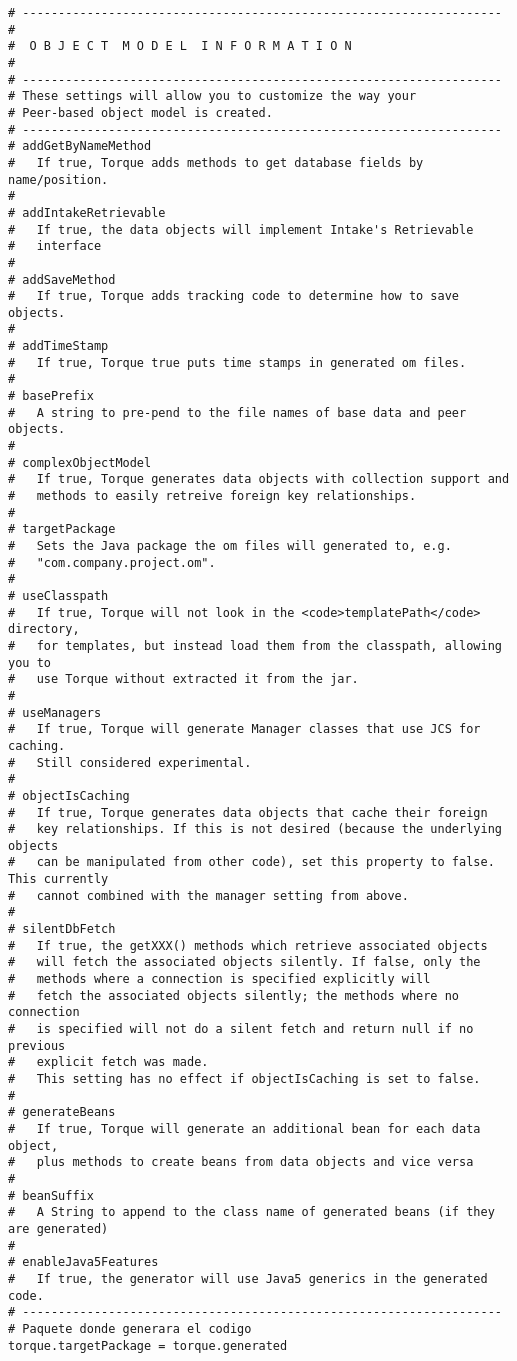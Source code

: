\begin{lstlisting}
# -------------------------------------------------------------------
#
#  O B J E C T  M O D E L  I N F O R M A T I O N
#
# -------------------------------------------------------------------
# These settings will allow you to customize the way your
# Peer-based object model is created.
# -------------------------------------------------------------------
# addGetByNameMethod
#   If true, Torque adds methods to get database fields by name/position.
#
# addIntakeRetrievable
#   If true, the data objects will implement Intake's Retrievable
#   interface
#
# addSaveMethod
#   If true, Torque adds tracking code to determine how to save objects.
#
# addTimeStamp
#   If true, Torque true puts time stamps in generated om files.
#
# basePrefix
#   A string to pre-pend to the file names of base data and peer objects.
#
# complexObjectModel
#   If true, Torque generates data objects with collection support and
#   methods to easily retreive foreign key relationships.
#
# targetPackage
#   Sets the Java package the om files will generated to, e.g.
#   "com.company.project.om".
#
# useClasspath
#   If true, Torque will not look in the <code>templatePath</code> directory,
#   for templates, but instead load them from the classpath, allowing you to
#   use Torque without extracted it from the jar.
#
# useManagers
#   If true, Torque will generate Manager classes that use JCS for caching.
#   Still considered experimental.
#
# objectIsCaching
#   If true, Torque generates data objects that cache their foreign
#   key relationships. If this is not desired (because the underlying objects
#   can be manipulated from other code), set this property to false. This currently
#   cannot combined with the manager setting from above.
#
# silentDbFetch
#   If true, the getXXX() methods which retrieve associated objects
#   will fetch the associated objects silently. If false, only the
#   methods where a connection is specified explicitly will
#   fetch the associated objects silently; the methods where no connection
#   is specified will not do a silent fetch and return null if no previous
#   explicit fetch was made.
#   This setting has no effect if objectIsCaching is set to false.
#
# generateBeans
#   If true, Torque will generate an additional bean for each data object,
#   plus methods to create beans from data objects and vice versa
#
# beanSuffix
#   A String to append to the class name of generated beans (if they are generated)
#
# enableJava5Features
#   If true, the generator will use Java5 generics in the generated code.
# -------------------------------------------------------------------
# Paquete donde generara el codigo
torque.targetPackage = torque.generated


\end{lstlisting}
